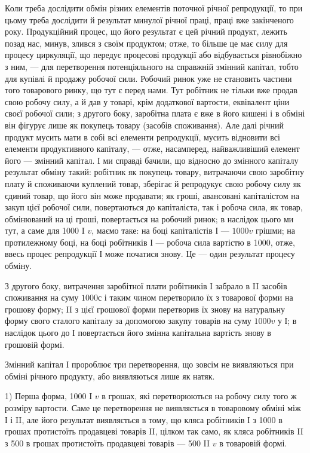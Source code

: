Коли треба дослідити обмін різних елементів поточної річної репродукції,
то при цьому треба дослідити й результат минулої річної праці,
праці вже закінченого року. Продукційний процес, що його результат є
цей річний продукт, лежить позад нас, минув, злився з своїм продуктом;
отже, то більше це має силу для процесу циркуляції, що передує
процесові продукції або відбувається рівнобіжно з ним, — для перетворення
потенціяльного на справжній змінний капітал, тобто для купівлі
й продажу робочої сили. Робочий ринок уже не становить частини того
товарового ринку, що тут є перед нами. Тут робітник не тільки вже продав
свою робочу силу, а й дав у товарі, крім додаткової вартости,
еквівалент ціни своєї робочої сили; з другого боку, заробітна плата є
вже в його кишені і в обміні він фігурує лише як покупець товару
(засобів споживання). Але далі річний продукт мусить мати в собі всі
елементи репродукції, мусить відновити всі елементи продуктивного капіталу,
— отже, насамперед, найважливіший елемент його — змінний капітал.
І ми справді бачили, що відносно до змінного капіталу результат обміну
такий: робітник як покупець товару, витрачаючи свою заробітну плату
й споживаючи куплений товар, зберігає й репродукує свою робочу силу
як єдиний товар, що його він може продавати; як гроші, авансовані
капіталістом на закуп цієї робочої сили, повертаються до капіталіста, так
і робоча сила, як товар, обмінюваний на ці гроші, повертається на робочий
ринок; в наслідок цього ми тут, а саме для 1000 I $v$, маємо таке:
на боці капіталістів І — $1000v$ грішми; на протилежному боці, на
боці робітників І — робоча сила вартістю в 1000, отже, ввесь процес
репродукції І може початися знову. Це — один результат процесу
обміну.

З другого боку, витрачення заробітної плати робітників І забрало
в II засобів споживання на суму $1000с$ і таким чином перетворило їх з
товарової форми на грошову форму; II з цієї грошової форми перетворив
їх знову на натуральну форму свого сталого капіталу за допомогою
закупу товарів на суму $1000v$ у І; в наслідок цього до І повертається
його змінна капітальна вартість знову в грошовій формі.

Змінний капітал І пророблює три перетворення, що зовсім не виявляються
при обміні річного продукту, або виявляються лише як натяк.

1) Перша форма, 1000 I $v$ в грошах, які перетворюються на робочу
силу того ж розміру вартости. Саме це перетворення не виявляється в
товаровому обміні між І і II, але його результат виявляється в тому, що
кляса робітників І з 1000 в грошах протистоїть продавцеві товарів II,
цілком так само, як кляса робітників II з 500 в грошах протистоїть
продавцеві товарів — 500 II $v$ в товаровій формі.

